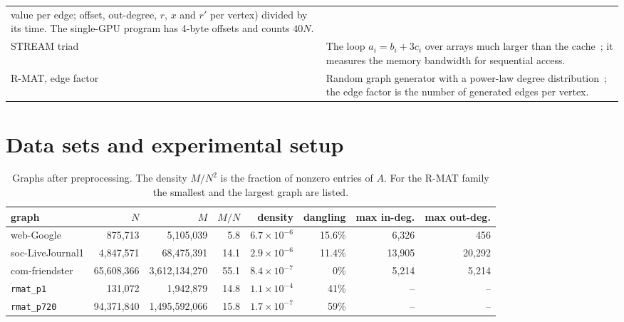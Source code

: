 \documentclass[11pt,a4paper]{article}
\newcommand{\code}[1]{\texttt{#1}}
\begin{document}
\begin{table}[tb]
\begin{tabularx}{\textwidth}{@{}>{\raggedright\arraybackslash}p{3.5cm} >{\raggedright\arraybackslash}X@{}}
  value per edge; offset, out-degree, $r$, $x$ and $r'$ per vertex) divided by its time. The single-GPU program has
  4-byte offsets and counts $40N$. \\
STREAM triad & The loop $a_i=b_i+3c_i$ over arrays much larger than the cache~\cite{stream}; it measures the memory
  bandwidth for sequential access. \\
R-MAT, edge factor & Random graph generator with a power-law degree distribution~\cite{rmat}; the edge factor is
  the number of generated edges per vertex. \\
\bottomrule
\end{tabularx}
\end{table}

\section{Data sets and experimental setup}
\label{sec:setup}

\begin{table}[tb]
\centering\footnotesize
\setlength{\tabcolsep}{5pt}
\caption{Graphs after preprocessing. The density $M/N^2$ is the fraction of nonzero entries of $A$. For the R-MAT
family the smallest and the largest graph are listed.}
\label{tab:graphs}
\begin{tabular}{lrrrrrrr}
\toprule
graph & $N$ & $M$ & $M/N$ & density & dangling & max in-deg. & max out-deg. \\
\midrule
web-Google        & 875,713    & 5,105,039     & 5.8  & $6.7\times10^{-6}$ & 15.6\% & 6,326  & 456 \\
soc-LiveJournal1  & 4,847,571  & 68,475,391    & 14.1 & $2.9\times10^{-6}$ & 11.4\% & 13,905 & 20,292 \\
com-friendster    & 65,608,366 & 3,612,134,270 & 55.1 & $8.4\times10^{-7}$ & 0\%    & 5,214  & 5,214 \\
\addlinespace[2pt]
\code{rmat\_p1}   & 131,072    & 1,942,879     & 14.8 & $1.1\times10^{-4}$ & 41\% & -- & -- \\
\code{rmat\_p720} & 94,371,840 & 1,495,592,066 & 15.8 & $1.7\times10^{-7}$ & 59\% & -- & -- \\
\bottomrule
\end{tabular}
\end{table}
\end{document}
